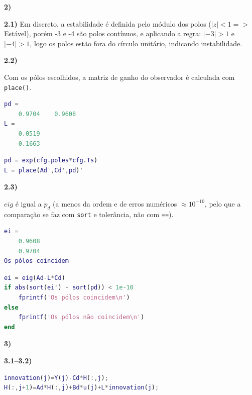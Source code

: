 \documentclass[12pt]{report}
\begin{document}
\noindent \textbf{2)}

\textbf{2.1)} Em discreto, a estabilidade é definida pelo módulo dos polos ($|z|<1 =>$ Estável), porém -3 e -4 são polos contínuos, e aplicando a regra: $|-3|>1$ e $|-4|>1$, logo os polos estão fora do círculo unitário, indicando instabilidade.

\textbf{2.2)}
\noindent
\begin{minipage}[t]{0.40\textwidth}
Com os pólos escolhidos, a matriz de ganho do observador é calculada com \lstinline{place()}.
\begin{lstlisting}[language=Matlab, caption={Resultado}, label={lst:obs_result}, numbers=none]
pd =
    0.9704    0.9608
L =
    0.0519
   -0.1663
\end{lstlisting}
\end{minipage}
\hfill
\begin{minipage}[t]{0.45\textwidth}
\begin{lstlisting}[language=Matlab]
pd = exp(cfg.poles*cfg.Ts)
L = place(Ad',Cd',pd)'
\end{lstlisting}
\label{lst:obsv}

\end{minipage}

\textbf{2.3)}
\begin{minipage}[t]{0.40\textwidth}
$eig$ é igual a $p_d$ (a menos da ordem e de erros numéricos $\approx10^{-10}$, pelo que a comparação se faz com \texttt{sort} e tolerância, não com \texttt{==}).
\begin{lstlisting}[language=Matlab, caption={Resultado}, label={lst:obs_result}, numbers=none]
ei =
    0.9608 
    0.9704
Os pólos coincidem
\end{lstlisting}
\end{minipage}
\hfill
\begin{minipage}[t]{0.45\textwidth}
\begin{lstlisting}[language=Matlab]
ei = eig(Ad-L*Cd)
if abs(sort(ei') - sort(pd)) < 1e-10
    fprintf('Os pólos coincidem\n')
else
    fprintf('Os pólos não coincidem\n')
end
\end{lstlisting}
\label{lst:polos}
\end{minipage}

\noindent \textbf{3)}

\textbf{3.1--3.2)} 

\begin{lstlisting}[language=Matlab, caption={Inovação e atualização do observador}, label={lst:inov}]
innovation(j)=Y(j)-Cd*H(:,j);
H(:,j+1)=Ad*H(:,j)+Bd*u(j)+L*innovation(j);
\end{lstlisting}
\end{document}
